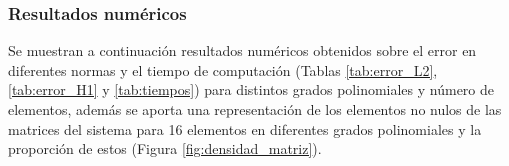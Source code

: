 \documentclass[11pt]{book}
\theoremstyle{plain} %
\theoremstyle{definition} %
\theoremstyle{definition} %
\begin{document}
\subsubsection{Resultados numéricos}


Se muestran a continuación resultados numéricos obtenidos sobre el error en diferentes normas y el tiempo de computación (Tablas \ref{tab:error_L2}, \ref{tab:error_H1} y \ref{tab:tiempos}) para distintos grados polinomiales y número de elementos,
además se aporta una representación de los elementos no nulos de las matrices del sistema para 16 elementos en diferentes grados polinomiales y la proporción de estos (Figura \ref{fig:densidad_matriz}).

\begin{table}[htbp]
    \centering
    \captionsetup{font=small, labelfont=bf}
    
    \begin{minipage}[b]{0.48\textwidth}
        \centering
        \caption{Error en norma $L^2$.}
        \label{tab:error_L2}
    \end{minipage}
    \hfill
    \begin{minipage}[b]{0.48\textwidth}
        \centering
        \caption{Error en norma $H^1$.}
        \label{tab:error_H1}
    \end{minipage}


\end{table}
\end{document}
